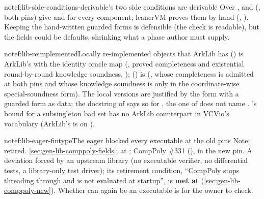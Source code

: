 \begin{finding}{note}{f:lib-side-conditions-derivable}{\texorpdfstring{}{Component.Complete}'s two side conditions are derivable}
Over , \allowbreak{}\allowbreak{} and \allowbreak{}
(\allowbreak{}\allowbreak{}, both pins) give  and
 for every component; leanerVM proves them by hand (,
). Keeping the hand-written guarded forms is defensible (the check is
readable), but the fields could be defaults, shrinking what a phase author must supply.
\end{finding}

\begin{finding}{note}{f:lib-reimplemented}{Locally re-implemented objects that ArkLib has}
 (\allowbreak{}) is ArkLib's
\allowbreak{} with the identity oracle map (,
proved completeness and existential round-by-round knowledge soundness, );
 (\allowbreak{}) is
\allowbreak{} (, whose completeness is
admitted at both pins and whose knowledge soundness is only in the coordinate-wise
special-soundness form). The local versions are justified by the  form with a guarded
form as data; the docstring of  says so for , the
one of  does not name . \allowbreak{}'s
bound for a subsingleton bad set has no ArkLib counterpart in VCVio's vocabulary (ArkLib's
 is on ).
\end{finding}

\begin{finding}{note}{f:lib-eager-fintype}{The eager \texorpdfstring{}{Fintype BF64} blocked every executable at the old pins}
\textsf{Note; retired.}
 \cref{sec:gen-lib-comppoly-fields}; \allowbreak{}\allowbreak{}
at ; CompPoly \#331 (), in the new pin.
 A deviation forced by an upstream library (no executable verifier, no
differential tests, a library-only test driver); its retirement condition, \enquote{CompPoly stops
threading \lean{[Fintype F]} through  and  is not evaluated at
startup}, is \textbf{met at } (\cref{sec:gen-lib-comppoly-new}). Whether
 can again be an executable is for the owner to check.
\end{finding}

